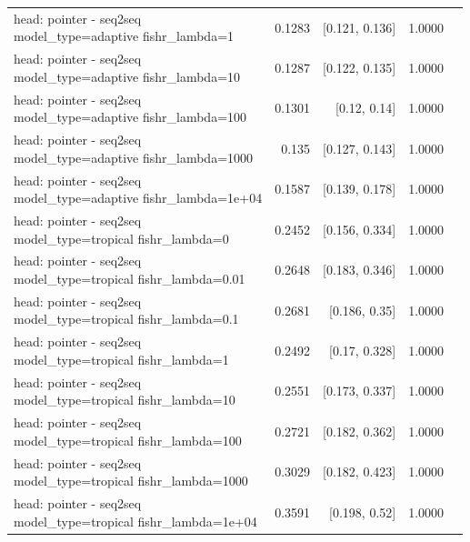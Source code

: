 \documentclass[10pt]{article}
\makeatletter
\newcommand{\stackcell}[1]{\begin{tabular}[t]{@{}l@{}}#1\end{tabular}}
\makeatother
\begin{document}
{\begin{longtable}{lrrrl}
\stackcell{head: pointer - seq2seq\\\footnotesize model\_type=adaptive fishr\_lambda=1 } & 0.1283 & [0.121, 0.136] & 1.0000 & \\
\stackcell{head: pointer - seq2seq\\\footnotesize model\_type=adaptive fishr\_lambda=10 } & 0.1287 & [0.122, 0.135] & 1.0000 & \\
\stackcell{head: pointer - seq2seq\\\footnotesize model\_type=adaptive fishr\_lambda=100 } & 0.1301 & [0.12, 0.14] & 1.0000 & \\
\stackcell{head: pointer - seq2seq\\\footnotesize model\_type=adaptive fishr\_lambda=1000 } & 0.135 & [0.127, 0.143] & 1.0000 & \\
\stackcell{head: pointer - seq2seq\\\footnotesize model\_type=adaptive fishr\_lambda=1e+04 } & 0.1587 & [0.139, 0.178] & 1.0000 & \\
\stackcell{head: pointer - seq2seq\\\footnotesize model\_type=tropical fishr\_lambda=0 } & 0.2452 & [0.156, 0.334] & 1.0000 & \\
\stackcell{head: pointer - seq2seq\\\footnotesize model\_type=tropical fishr\_lambda=0.01 } & 0.2648 & [0.183, 0.346] & 1.0000 & \\
\stackcell{head: pointer - seq2seq\\\footnotesize model\_type=tropical fishr\_lambda=0.1 } & 0.2681 & [0.186, 0.35] & 1.0000 & \\
\stackcell{head: pointer - seq2seq\\\footnotesize model\_type=tropical fishr\_lambda=1 } & 0.2492 & [0.17, 0.328] & 1.0000 & \\
\stackcell{head: pointer - seq2seq\\\footnotesize model\_type=tropical fishr\_lambda=10 } & 0.2551 & [0.173, 0.337] & 1.0000 & \\
\stackcell{head: pointer - seq2seq\\\footnotesize model\_type=tropical fishr\_lambda=100 } & 0.2721 & [0.182, 0.362] & 1.0000 & \\
\stackcell{head: pointer - seq2seq\\\footnotesize model\_type=tropical fishr\_lambda=1000 } & 0.3029 & [0.182, 0.423] & 1.0000 & \\
\stackcell{head: pointer - seq2seq\\\footnotesize model\_type=tropical fishr\_lambda=1e+04 } & 0.3591 & [0.198, 0.52] & 1.0000 & \\

\end{longtable}}
\end{document}
